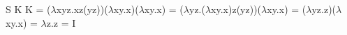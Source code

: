 \documentclass{article}
\begin{document}
   
    S K K = ($\lambda$xyz.xz(yz))($\lambda$xy.x)($\lambda$xy.x) = 
    ($\lambda$yz.($\lambda$xy.x)z(yz))($\lambda$xy.x) = 
    ($\lambda$yz.z)($\lambda$xy.x) = $\lambda$z.z = I
\end{document}
